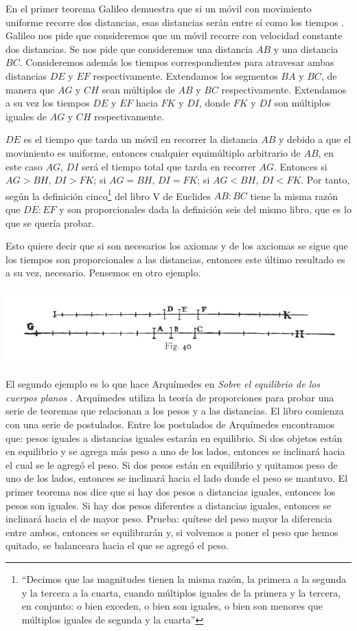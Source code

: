 En el primer teorema Galileo demuestra que si un móvil con movimiento uniforme recorre dos distancias, esas distancias serán entre sí como los tiempos \cite[p. 215]{galtre}. Galileo nos pide que consideremos que un móvil recorre con velocidad constante dos distancias. Se nos pide que consideremos una distancia $AB$ y una distancia $BC$. Consideremos además los tiempos correspondientes para atravesar ambas distancias $DE$ y $EF$ respectivamente. Extendamos los segmentos $BA$ y $BC$, de manera que $AG$ y $CH$ sean múltiplos de $AB$ y $BC$ respectivamente. Extendamos a su vez los tiempos $DE$ y $EF$ hacia $FK$ y $DI$, donde $FK$ y $DI$ son múltiplos iguales de $AG$ y $CH$ respectivamente.

$DE$ es el tiempo que tarda un móvil en recorrer la distancia $AB$ y debido a que el movimiento es uniforme, entonces cualquier equimúltiplo arbitrario de $AB$, en este caso $AG$, $DI$ será el tiempo total que tarda en recorrer $AG$. Entonces si $AG > BH$, $DI > FK$; si $AG = BH$, $DI = FK$; si $AG < BH$, $DI < FK$. Por tanto, según la definición cinco\footnote{``Decimos que las magnitudes tienen la misma razón, la primera a la segunda y  la tercera a la cuarta, cuando múltiplos iguales de la primera y la tercera, en conjunto: o bien exceden, o bien son iguales, o bien son menores que múltiplos iguales de segunda y la cuarta''} del libro V de Euclides \cite{Euclides1956} $AB:BC$ tiene la misma razón que $DE:EF$ y son proporcionales dada la definición seis del mismo libro, que es lo que se quería probar.

Esto quiere decir que si son necesarios los axiomas y de los axciomas se sigue que los tiempos son proporcionales a las distancias, entonces este último resultado es a su vez, necesario. Pensemos en otro ejemplo.

\includegraphics[width=\textwidth]{fig40.jpg}

El segundo ejemplo es lo que hace Arquímedes en \emph{Sobre el equilibrio de los cuerpos planos} \cite{Archimedes1897}. Arquímedes utiliza la teoría de proporciones para probar una serie de teoremas que relacionan a los pesos y a las distancias. El libro comienza con una serie de postulados. Entre los postulados de Arquímedes encontramos que: pesos iguales a distancias iguales estarán en equilibrio. Si dos objetos están en equilibrio y se agrega más peso a uno de los lados, entonces se inclinará hacia el cual se le agregó el peso. Si dos pesos están en equilibrio y quitamos peso de uno de los lados, entonces se inclinará hacia el lado donde el peso se mantuvo. El primer teorema nos dice que si hay dos pesos a distancias iguales, entonces los pesos son iguales. Si hay dos pesos diferentes a distancias iguales, entonces se inclinará hacia el de mayor peso. Prueba: quítese del peso mayor la diferencia entre ambos, entonces se equilibrarán y, si volvemos a poner el peso que hemos quitado, se balanceara hacia el que se agregó el peso.

